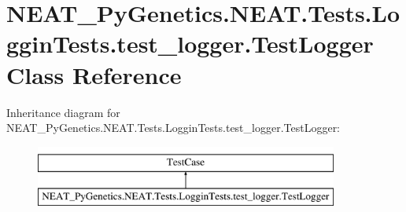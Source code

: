 \hypertarget{class_n_e_a_t___py_genetics_1_1_n_e_a_t_1_1_tests_1_1_loggin_tests_1_1test__logger_1_1_test_logger}{}\section{N\+E\+A\+T\+\_\+\+Py\+Genetics.\+N\+E\+A\+T.\+Tests.\+Loggin\+Tests.\+test\+\_\+logger.\+Test\+Logger Class Reference}
\label{class_n_e_a_t___py_genetics_1_1_n_e_a_t_1_1_tests_1_1_loggin_tests_1_1test__logger_1_1_test_logger}
Inheritance diagram for N\+E\+A\+T\+\_\+\+Py\+Genetics.\+N\+E\+A\+T.\+Tests.\+Loggin\+Tests.\+test\+\_\+logger.\+Test\+Logger\+:\begin{figure}[H]
\begin{center}
\leavevmode
\includegraphics[height=2.000000cm]{class_n_e_a_t___py_genetics_1_1_n_e_a_t_1_1_tests_1_1_loggin_tests_1_1test__logger_1_1_test_logger}
\end{center}
\end{figure}
